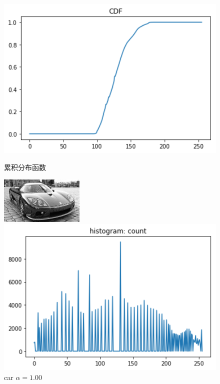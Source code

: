 \documentclass[a4paper,UTF8]{article}
\numberwithin{equation}{section}
\begin{document}
\begin{enumerate}[(\romannumeral1)]
\begin{figure}[t]
\begin{minipage}[t]{0.3\textwidth}
\centering
\includegraphics[width=1.0\textwidth]{car_pdf.png}
\caption{累积分布函数}
\label{car:cdf}
\end{minipage}
\centering
\begin{minipage}[t]{0.30\textwidth}
\centering
\includegraphics[width=4cm]{car_processed.png}
\caption{car $\alpha=1.00$}
\label{car:processed}
\end{minipage}
\centering
\begin{minipage}[t]{0.3\textwidth}
\centering
\includegraphics[width=1.0\textwidth]{car_processed_count.png}

\end{minipage}
\end{figure}
\end{enumerate}
\end{document}
